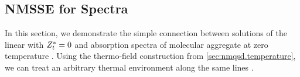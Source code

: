 
\subsection{NMSSE for Spectra}
\label{sub:app.spectra.nmsse}

In this section, we demonstrate the simple connection between solutions of the linear \NMSSE with ${Z}^*_t = 0$ and absorption spectra of molecular aggregate at zero temperature \cite{RoEiWo09_aggregats,RoStEi11_nmqsd_aggregats}.
Using the thermo-field construction from \autoref{sec:nmqsd.temperature}, we can treat an arbitrary thermal environment along the same lines \cite{}.

